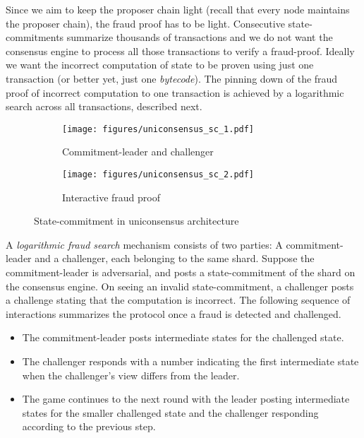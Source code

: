 \documentclass{article}
\begin{document}
Since we aim to keep the proposer chain light (recall that every node maintains the proposer chain), the fraud proof has to be light. Consecutive state-commitments summarize thousands of transactions and we do not want the consensus engine to process all those transactions to verify a fraud-proof. Ideally we want the incorrect computation of state to be proven using just one transaction (or better yet, just one {\em bytecode}). The pinning  down of the fraud proof of incorrect computation to one transaction is achieved by a logarithmic search across all transactions, described next. 

\begin{figure}[h]

\begin{subfigure}{0.3\textwidth}
\texttt{[image: figures/uniconsensus\_sc\_1.pdf]} 
\caption{Commitment-leader and challenger}
\label{fig:uni_sc_1}
\end{subfigure}
\begin{subfigure}{0.65\textwidth}
\texttt{[image: figures/uniconsensus\_sc\_2.pdf]}
\caption{Interactive fraud proof}
\label{fig:uni_sc_2}
\end{subfigure}

\caption{State-commitment in uniconsensus architecture}
\label{fig:uni_sc_all}
\end{figure}

A {\em logarithmic fraud search} mechanism consists of two parties: A commitment-leader and a challenger, each belonging to the same shard. Suppose the commitment-leader is adversarial, and   posts a state-commitment of the shard on the consensus engine. On seeing an invalid state-commitment, a challenger posts a challenge stating that the computation is incorrect. The following sequence of interactions summarizes the protocol once a fraud is detected and challenged. 
\begin{itemize}
    \item The commitment-leader posts intermediate states for the challenged state. 
    \item The challenger responds with a number indicating the first intermediate state when the challenger's view differs from the leader.
    \item The game continues to the next round with the leader posting intermediate states for the smaller challenged state and the challenger responding according to the previous step. 
\end{itemize}
\end{document}
